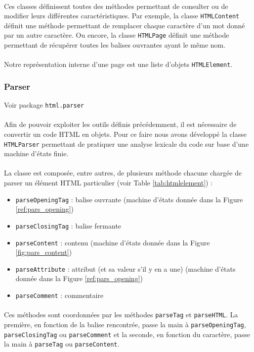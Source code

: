 \documentclass[a4paper,11pt]{article}
\newcommand{\ttseek}[1]{Voir package \texttt{#1}\paragraph{}}
\begin{document}
\paragraph{} Ces classes définissent toutes des méthodes permettant de consulter ou de modifier leurs différentes caractéristiques. Par exemple, la classe \texttt{HTMLContent} définit une méthode permettant de remplacer chaque caractère d'un mot donné par un autre caractère. Ou encore, la classe \texttt{HTMLPage} définit une méthode permettant de récupérer toutes les balises ouvrantes ayant le même nom.
\paragraph{}
Notre représentation interne d'une page est une liste d'objets \texttt{HTMLElement}.
\subsubsection{Parser}
\ttseek{html.parser}
Afin de pouvoir exploiter les outils définis précédemment, il est nécessaire de convertir un code HTML en objets. Pour ce faire nous avons développé la classe \texttt{HTMLParser} permettant de pratiquer une analyse lexicale du code sur base d'une machine d'états finie.
\paragraph{}
La classe est composée, entre autres, de plusieurs méthode chacune chargée de parser un élément HTML particulier (voir Table \ref{tab:htmlelement}) :
\begin{itemize}
	\item \texttt{parseOpeningTag} : balise ouvrante (machine d'états donnée dans la Figure \ref{ref:pars_opening})
	\item \texttt{parseClosingTag} : balise fermante
	\item \texttt{parseContent} : contenu (machine d'états donnée dans la Figure \ref{fig:pars_content})
	\item \texttt{parseAttribute} : attribut (et sa valeur s'il y en a une) (machine d'états donnée dans la Figure \ref{ref:pars_opening})
	\item \texttt{parseComment} : commentaire
\end{itemize}
\paragraph{}
Ces méthodes sont coordonnées par les méthodes \texttt{parseTag} et \texttt{parseHTML}. La première, en fonction de la balise rencontrée, passe la main à \texttt{parseOpeningTag}, \texttt{parseClosingTag} ou \texttt{parseComment} et la seconde, en fonction du caractère, passe la main à \texttt{parseTag} ou \texttt{parseContent}.
\end{document}
